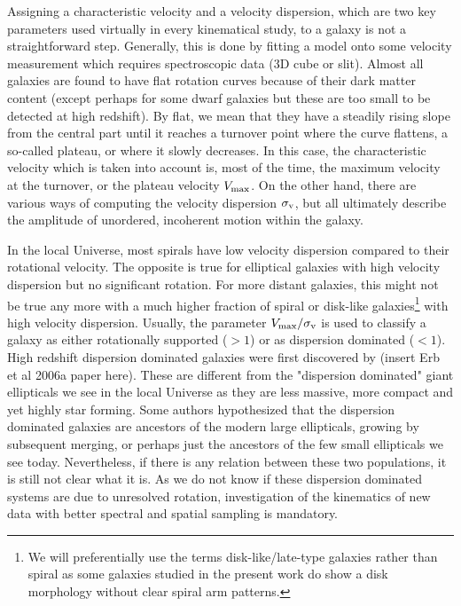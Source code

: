 Assigning a characteristic velocity and a velocity dispersion, which are two key parameters used virtually in every kinematical study, to a galaxy is not a straightforward step. Generally, this is done by fitting a model onto some velocity measurement which requires spectroscopic data (3D cube or slit). Almost all galaxies are found to have flat rotation curves because of their dark matter content (except perhaps for some dwarf galaxies but these are too small to be detected at high redshift). By flat, we mean that they have a steadily rising slope from the central part until it reaches a turnover point where the curve flattens, a so-called plateau, or where it slowly decreases. In this case, the characteristic velocity which is taken into account is, most of the time, the maximum velocity at the turnover, or the plateau velocity $V_{\rm{max}}$. On the other hand, there are various ways of computing the velocity dispersion $\sigma_{\rm{v}}$, but all ultimately describe the amplitude of unordered, incoherent motion within the galaxy.

In the local Universe, most spirals have low velocity dispersion compared to their rotational velocity. The opposite is true for elliptical galaxies with high velocity dispersion but no significant rotation. For more distant galaxies, this might not be true any more with a much higher fraction of spiral or disk-like galaxies\footnote{We will preferentially use the terms disk-like/late-type galaxies rather than spiral as some galaxies studied in the present work do show a disk morphology without clear spiral arm patterns.} with high velocity dispersion. Usually, the parameter $V_{\rm{max}} / \sigma_{\rm{v}}$ is used to classify a galaxy as either rotationally supported ($> 1$) or as dispersion dominated ($< 1$). High redshift dispersion dominated galaxies were first discovered by (insert Erb et al 2006a paper here). These are different from the "dispersion dominated" giant ellipticals we see in the local Universe as they are less massive, more compact and yet highly star forming. Some authors hypothesized that the dispersion dominated galaxies are ancestors of the modern large ellipticals, growing by subsequent merging, or perhaps just the ancestors of the few small ellipticals we see today. Nevertheless, if there is any relation between these two populations, it is still not clear what it is. As we do not know if these dispersion dominated systems are due to unresolved rotation, investigation of the kinematics of new data with better spectral and spatial sampling is mandatory.

